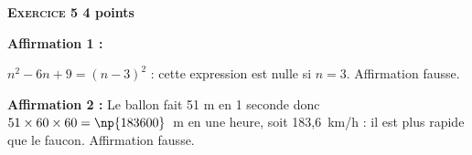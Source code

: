 \textbf{\textsc{Exercice 5} \hfill 4 points}

\medskip
 
%
%

\textbf{Affirmation 1 :} %

$n^2 - 6n + 9 = (n - 3)^2$ : cette expression est nulle si $n = 3$. Affirmation fausse.
\smallskip

\textbf{Affirmation 2 :} %
Le ballon fait 51 m en 1 seconde donc  $51 \times 60 \times 60 = \np{183600}$~m en une heure, soit 183,6~km/h : il est plus rapide que le faucon. Affirmation fausse.
\vspace{0.25cm}

